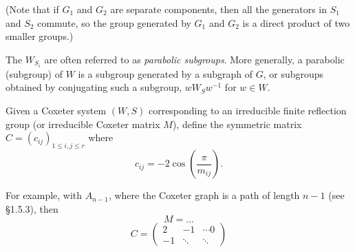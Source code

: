 (Note that if $G_1$ and $G_2$ are separate components, then all the generators
in $S_1$ and $S_2$ commute, so the group generated by $G_1$ and $G_2$ is a
direct product of two smaller groups.)

The $W_{S_i}$ are often referred to as {\em parabolic subgroups}. More generally,
a parabolic (subgroup) of $W$ is a subgroup generated by a subgraph of $G$, or
subgroups obtained by conjugating such a subgroup, $w W_S w^{-1}$ for $w \in W$.

Given a Coxeter system $(W, S)$ corresponding to an irreducible finite reflection
group (or irreducible Coxeter matrix $M$), define the symmetric matrix
$C = (c_{ij})_{1 \leq i,j \leq r}$ where
\[
    c_{ij} = -2 \cos \left(\frac{\pi}{m_{ij}} \right).
\]

For example, with $A_{n-1}$, where the Coxeter graph is a path of length $n-1$
(see \S 1.5.3), then
\[
    M = ...
\]
\[
    C = \begin{pmatrix}
    2 & -1 & \cdots 0 \\
    -1 & \ddots & \ddots
    \end{pmatrix}
\]
